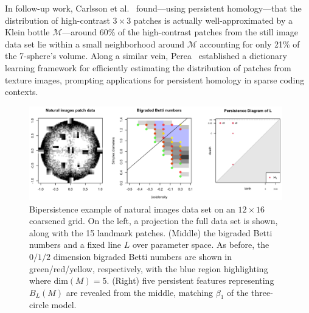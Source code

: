 \documentclass[sn-mathphys]{sn-jnl}
\begin{document}
In follow-up work, Carlsson et al.~\cite{carlsson2008local} found---using persistent homology---that the distribution of high-contrast $3 \times 3$ patches is actually well-approximated by a Klein bottle $\mathcal{M}$---around 60\% of the high-contrast patches from the still image data set lie within a small neighborhood around $\mathcal{M}$ accounting for only 21\% of the 7-sphere's volume. 
Along a similar vein, Perea~\cite{perea2014klein} established a dictionary learning framework for efficiently estimating the distribution of patches from texture images, prompting applications for persistent homology in sparse coding contexts. 

 \begin{figure}[t]
	\includegraphics[width=0.98\textwidth]{natural_images}
	\caption{Bipersistence example of natural images data set on an $12 \times 16$ coarsened grid. On the left, a projection the full data set is shown, along with the 15 landmark patches. (Middle) the bigraded Betti numbers and a fixed line $L$ over parameter space. 
	As before, the $0/1/2$ dimension bigraded Betti numbers are shown in green/red/yellow, respectively, with the blue region highlighting where $\mathrm{dim}(M) = 5$. (Right) five persistent features representing $B_L(M)$ are revealed from the middle, matching $\beta_1$ of the three-circle model. }
	\label{fig:patch_data_dgm}
\end{figure}
\end{document}
